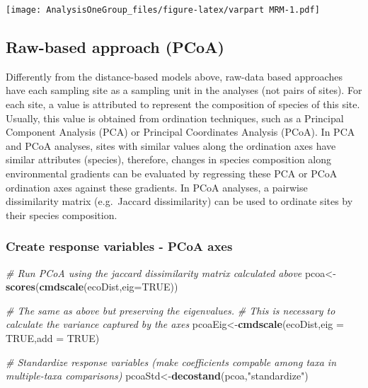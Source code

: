 \documentclass[]{article}
\newenvironment{Shaded}{\begin{snugshade}}{\end{snugshade}}
\newcommand{\CommentTok}[1]{\textcolor[rgb]{0.56,0.35,0.01}{\textit{#1}}}
\newcommand{\DataTypeTok}[1]{\textcolor[rgb]{0.13,0.29,0.53}{#1}}
\newcommand{\KeywordTok}[1]{\textcolor[rgb]{0.13,0.29,0.53}{\textbf{#1}}}
\newcommand{\NormalTok}[1]{#1}
\newcommand{\OtherTok}[1]{\textcolor[rgb]{0.56,0.35,0.01}{#1}}
\newcommand{\StringTok}[1]{\textcolor[rgb]{0.31,0.60,0.02}{#1}}
\begin{document}
\texttt{[image: AnalysisOneGroup\_files/figure-latex/varpart MRM-1.pdf]}

\hypertarget{raw-based-approach-pcoa}{%
\subsection{Raw-based approach (PCoA)}\label{raw-based-approach-pcoa}}

Differently from the distance-based models above, raw-data based
approaches have each sampling site as a sampling unit in the analyses
(not pairs of sites). For each site, a value is attributed to represent
the composition of species of this site. Usually, this value is obtained
from ordination techniques, such as a Principal Component Analysis (PCA)
or Principal Coordinates Analysis (PCoA). In PCA and PCoA analyses,
sites with similar values along the ordination axes have similar
attributes (species), therefore, changes in species composition along
environmental gradients can be evaluated by regressing these PCA or PCoA
ordination axes against these gradients. In PCoA analyses, a pairwise
dissimilarity matrix (e.g.~Jaccard dissimilarity) can be used to
ordinate sites by their species composition.

\hypertarget{create-response-variables---pcoa-axes}{%
\subsubsection{Create response variables - PCoA
axes}\label{create-response-variables---pcoa-axes}}

\begin{Shaded}
\begin{Highlighting}[]
\CommentTok{# Run PCoA using the jaccard dissimilarity matrix calculated above}
\NormalTok{pcoa<-}\KeywordTok{scores}\NormalTok{(}\KeywordTok{cmdscale}\NormalTok{(ecoDist,}\DataTypeTok{eig=}\OtherTok{TRUE}\NormalTok{))}

\CommentTok{# The same as above but preserving the eigenvalues.}
\CommentTok{# This is necessary to calculate the variance captured by the axes}
\NormalTok{pcoaEig<-}\KeywordTok{cmdscale}\NormalTok{(ecoDist,}\DataTypeTok{eig =} \OtherTok{TRUE}\NormalTok{,}\DataTypeTok{add =} \OtherTok{TRUE}\NormalTok{)}


\CommentTok{# Standardize response variables (make coefficients compable among taxa in multiple-taxa comparisons)}
\NormalTok{pcoaStd<-}\KeywordTok{decostand}\NormalTok{(pcoa,}\StringTok{"standardize"}\NormalTok{)}
\end{Highlighting}
\end{Shaded}
\end{document}
